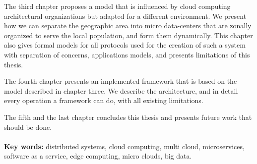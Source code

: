 The third chapter proposes a model that is influenced by cloud computing architectural organizations but adapted for a different environment. We present how we can separate the geographic area into micro data-centers that are zonally organized to serve the local population, and form them dynamically. This chapter also gives formal models for all protocols used for the creation of such a system with separation of concerns, applications models, and presents limitations of this thesis.

The fourth chapter presents an implemented framework that is based on the model described in chapter three. We describe the architecture, and in detail every operation a framework can do, with all existing limitations.

The fifth and the last chapter concludes this thesis and presents future work that should be done.\\\\ 

\noindent
\textbf{Key words:} distributed systems, cloud computing, multi cloud, microservices, software as a service, edge computing, micro clouds, big data.